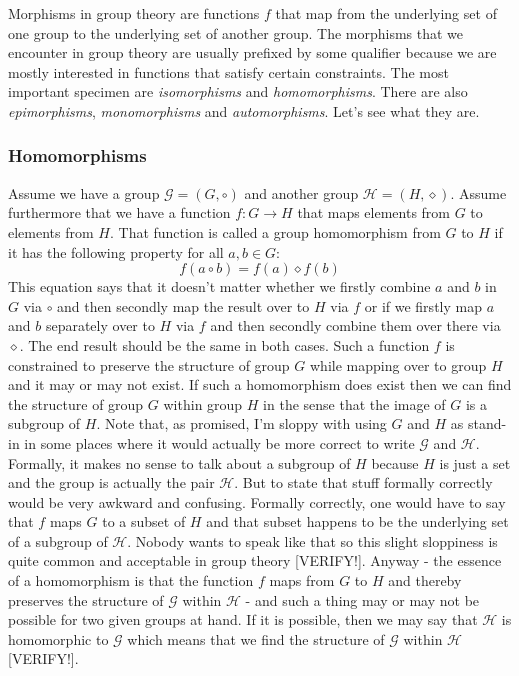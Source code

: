 Morphisms in group theory are functions $f$ that map from the underlying set of one group to the underlying set of another group. The morphisms that we encounter in group theory are usually prefixed by some qualifier because we are mostly interested in functions that satisfy certain constraints. The most important specimen are \emph{isomorphisms} and \emph{homomorphisms}. There are also \emph{epimorphisms}, \emph{monomorphisms} and \emph{automorphisms}. Let's see what they are.

\subsubsection{Homomorphisms}

Assume we have a group $\mathcal{G} = (G, \circ)$ and another group $\mathcal{H} = (H, \diamond)$. Assume furthermore that we have a function $f: G \rightarrow H$ that maps elements from $G$ to elements from $H$. That function is called a group homomorphism from $G$ to $H$ if it has the following property for all $a,b \in G$:
\begin{equation}
	f(a \circ b) = f(a) \diamond f(b)
\end{equation}
This equation says that it doesn't matter whether we firstly combine $a$ and $b$ in $G$ via $\circ$ and then secondly map the result over to $H$ via $f$ or if we firstly map $a$ and $b$ separately over to $H$ via $f$ and then secondly combine them over there via $\diamond$. The end result should be the same in both cases. Such a function $f$ is constrained to preserve the structure of group $G$ while mapping over to group $H$ and it may or may not exist. If such a homomorphism does exist then we can find the structure of group $G$ within group $H$ in the sense that the image of $G$ is a subgroup of $H$. Note that, as promised, I'm sloppy with using $G$ and $H$ as stand-in in some places where it would actually be more correct to write $\mathcal{G}$ and $\mathcal{H}$. Formally, it makes no sense to talk about a subgroup of $H$ because $H$ is just a set and the group is actually the pair $\mathcal{H}$. But to state that stuff formally correctly would be very awkward and confusing. Formally correctly, one would have to say that $f$ maps $G$ to a subset of $H$ and that subset happens to be the underlying set of a subgroup of $\mathcal{H}$. Nobody wants to speak like that so this slight sloppiness is quite common and acceptable in group theory [VERIFY!]. Anyway - the essence of a homomorphism is that the function $f$ maps from $G$ to $H$ and thereby preserves the structure of $\mathcal{G}$ within $\mathcal{H}$ - and such a thing may or may not be possible for two given groups at hand. If it is possible, then we may say that $\mathcal{H}$ is homomorphic to $\mathcal{G}$ which means that we find the structure of $\mathcal{G}$ within $\mathcal{H}$ [VERIFY!].

